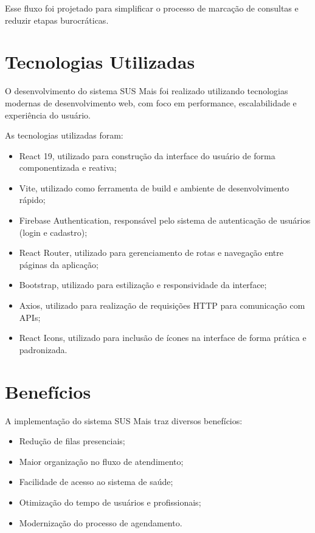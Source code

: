 \documentclass[12pt,a4paper]{article}
\begin{document}
Esse fluxo foi projetado para simplificar o processo de marcação de consultas e reduzir etapas burocráticas.

\section{Tecnologias Utilizadas}

O desenvolvimento do sistema SUS Mais foi realizado utilizando tecnologias modernas de desenvolvimento web, com foco em performance, escalabilidade e experiência do usuário.

As tecnologias utilizadas foram:

\begin{itemize}
    \item React 19, utilizado para construção da interface do usuário de forma componentizada e reativa;
    \item Vite, utilizado como ferramenta de build e ambiente de desenvolvimento rápido;
    \item Firebase Authentication, responsável pelo sistema de autenticação de usuários (login e cadastro);
    \item React Router, utilizado para gerenciamento de rotas e navegação entre páginas da aplicação;
    \item Bootstrap, utilizado para estilização e responsividade da interface;
    \item Axios, utilizado para realização de requisições HTTP para comunicação com APIs;
    \item React Icons, utilizado para inclusão de ícones na interface de forma prática e padronizada.
\end{itemize}

\section{Benefícios}

A implementação do sistema SUS Mais traz diversos benefícios:

\begin{itemize}
    \item Redução de filas presenciais;
    \item Maior organização no fluxo de atendimento;
    \item Facilidade de acesso ao sistema de saúde;
    \item Otimização do tempo de usuários e profissionais;
    \item Modernização do processo de agendamento.
\end{itemize}
\end{document}
